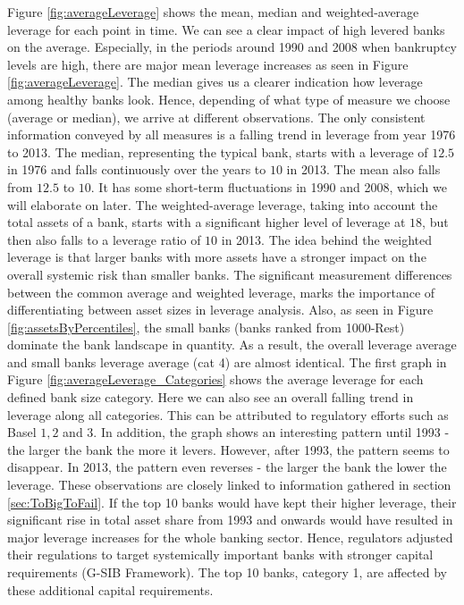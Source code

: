 \documentclass[12pt, a4paper]{article} %
\begin{document}
Figure \ref{fig:averageLeverage} shows the mean, median and weighted-average leverage for each point in time. We can see a clear impact of high levered banks on the average. Especially, in the periods around 1990 and 2008 when bankruptcy levels are high, there are major mean leverage increases as seen in Figure \ref{fig:averageLeverage}. The median gives us a clearer indication how leverage among healthy banks look. Hence, depending of what type of measure we choose (average or median), we arrive at different observations. The only consistent information conveyed by all measures is a falling trend in leverage from year 1976 to 2013. The median, representing the typical bank, starts with a leverage of $12.5$ in 1976 and falls continuously over the years to $10$ in 2013. The mean also falls from $12.5$ to $10$. It has some short-term fluctuations in 1990 and 2008, which we will elaborate on later. The weighted-average leverage, taking into account the total assets of a bank, starts with a significant higher level of leverage at $18$, but then also falls to a leverage ratio of $10$ in 2013. The idea behind the weighted leverage is that larger banks with more assets have a stronger impact on the overall systemic risk than smaller banks. The significant measurement differences between the common average and weighted leverage, marks the importance of differentiating between asset sizes in leverage analysis. Also, as seen in Figure \ref{fig:assetsByPercentiles}, the small banks (banks ranked from 1000-Rest) dominate the bank landscape in quantity. As a result, the overall leverage average and small banks leverage average (cat 4) are almost identical. 
The first graph in Figure \ref{fig:averageLeverage_Categories} shows the average leverage for each defined bank size category. Here we can also see an overall falling trend in leverage along all categories. This can be attributed to regulatory efforts such as Basel $1,2$ and $3$. In addition, the graph shows an interesting pattern until 1993 - the larger the bank the more it levers. However, after 1993, the pattern seems to disappear. In 2013, the pattern even reverses - the larger the bank the lower the leverage. These observations are closely linked to information gathered in section \ref{sec:ToBigToFail}. If the top 10 banks would have kept their higher leverage, their significant rise in total asset share from 1993 and onwards would have resulted in major leverage increases for the whole banking sector. Hence, regulators adjusted their regulations to target systemically important banks with stronger capital requirements (G-SIB Framework). The top 10 banks, category 1, are affected by these additional capital requirements.
\end{document}
